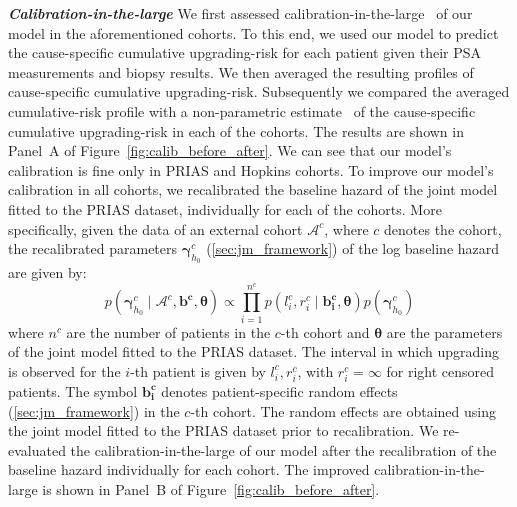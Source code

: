 \textbf{\textit{Calibration-in-the-large}}
We first assessed calibration-in-the-large~\citep{steyerberg2010assessing} of our model in the aforementioned cohorts. To this end, we used our model to predict the cause-specific cumulative upgrading-risk for each patient given their PSA measurements and biopsy results. We then averaged the resulting profiles of cause-specific cumulative upgrading-risk. Subsequently we compared the averaged cumulative-risk profile with a non-parametric estimate~\citep{turnbull1976empirical} of the cause-specific cumulative upgrading-risk in each of the cohorts. The results are shown in Panel~A of Figure~\ref{fig:calib_before_after}. We can see that our model's calibration is fine only in PRIAS and Hopkins cohorts. To improve our model's calibration in all cohorts, we recalibrated the baseline hazard of the joint model fitted to the PRIAS dataset, individually for each of the cohorts. More specifically, given the data of an external cohort $\mathcal{A}^c$, where $c$ denotes the cohort, the recalibrated parameters $\boldsymbol{\gamma}_{h_0}^c$ (\ref{sec:jm_framework}) of the log baseline hazard are given by:
\begin{equation}
p(\boldsymbol{\gamma}_{h_0}^c \mid \mathcal{A}^c, \boldsymbol{b^c},  \boldsymbol{\theta}) \propto  \prod_{i=1}^{n^c} p(l_i^c, r_i^c \mid \boldsymbol{b^c_i}, \boldsymbol{\theta}) p(\boldsymbol{\gamma}_{h_0}^c)
\end{equation}
where $n^c$ are the number of patients in the $c$-th cohort and $\boldsymbol{\theta}$ are the parameters of the joint model fitted to the PRIAS dataset. The interval in which upgrading is observed for the $i$-th patient is given by $l_i^c, r_i^c$, with $r_i^c = \infty$ for right censored patients. The symbol $\boldsymbol{b^c_i}$ denotes patient-specific random effects (\ref{sec:jm_framework}) in the $c$-th cohort. The random effects are obtained using the joint model fitted to the PRIAS dataset prior to recalibration. We re-evaluated the calibration-in-the-large of our model after the recalibration of the baseline hazard individually for each cohort. The improved calibration-in-the-large is shown in Panel~B of Figure~\ref{fig:calib_before_after}.

